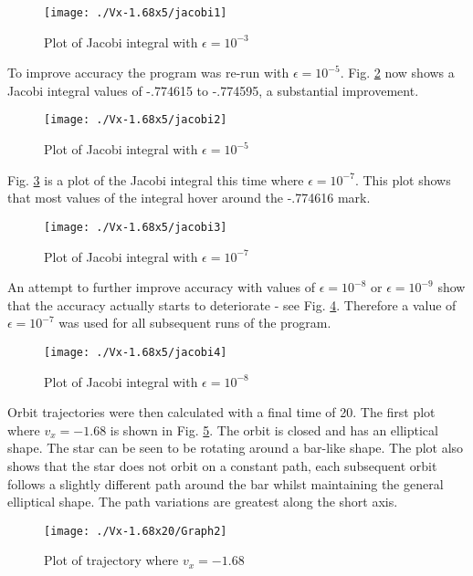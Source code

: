 \documentclass[a4paper,12pt]{article}
\begin{document}
\begin{figure}[H]
\centering
\texttt{[image: ./Vx-1.68x5/jacobi1]}
\caption{Plot of Jacobi integral with $\epsilon=10^{-3}$}
\label{fig:jacobi1}
\end{figure}

To improve accuracy the program was re-run with $\epsilon=10^{-5}$. Fig. \ref{fig:jacobi2} now shows a Jacobi integral values of -.774615 to -.774595, a substantial improvement.

\begin{figure}[H]
\centering
\texttt{[image: ./Vx-1.68x5/jacobi2]}
\caption{Plot of Jacobi integral with $\epsilon=10^{-5}$}
\label{fig:jacobi2}
\end{figure}

Fig. \ref{fig:jacobi3} is a plot of the Jacobi integral this time where $\epsilon=10^{-7}$. This plot shows that most values of the integral hover around the -.774616 mark.
\begin{figure}[H]
\centering
\texttt{[image: ./Vx-1.68x5/jacobi3]}
\caption{Plot of Jacobi integral with $\epsilon=10^{-7}$}
\label{fig:jacobi3}
\end{figure}

An attempt to further improve accuracy with values of $\epsilon=10^{-8}$ or $\epsilon=10^{-9}$ show that the accuracy actually starts to deteriorate - see Fig. \ref{fig:jacobi4}. Therefore a value of $\epsilon=10^{-7}$ was used for all subsequent runs of the program.

\begin{figure}[H]
\centering
\texttt{[image: ./Vx-1.68x5/jacobi4]}
\caption{Plot of Jacobi integral with $\epsilon=10^{-8}$}
\label{fig:jacobi4}
\end{figure}

Orbit trajectories were then calculated with a final time of 20. The first plot where $v_x=-1.68$ is shown in Fig. \ref{fig:orbit1}. The orbit is closed and has an elliptical shape. The star can be seen to be rotating around a bar-like shape. The plot also shows that the star does not orbit on a constant path, each subsequent orbit follows a slightly different path around the bar whilst maintaining the general elliptical shape. The path variations are greatest along the short axis.

\begin{figure}[H]
\centering
\texttt{[image: ./Vx-1.68x20/Graph2]}
\caption{Plot of trajectory where $v_x=-1.68$}
\label{fig:orbit1}
\end{figure}
\end{document}
